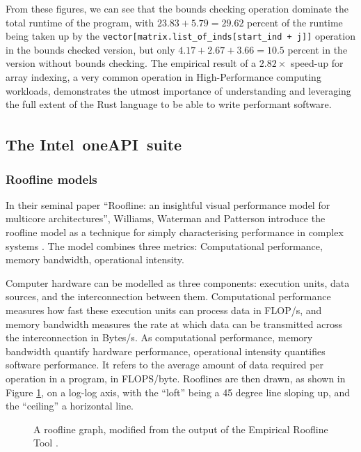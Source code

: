 From these figures, we can see that the bounds checking operation dominate the total runtime of the program, with $23.83 + 5.79 = 29.62$ percent of the runtime being taken up by the \texttt{vector[matrix.list_of_inds[start_ind + j]]} operation in the bounds checked version, but only $4.17 + 2.67 + 3.66 = 10.5$ percent in the version without bounds checking. The empirical result of a $2.82\times$ speed-up for array indexing, a very common operation in High-Performance computing workloads, demonstrates the utmost importance of understanding and leveraging the full extent of the Rust language to be able to write performant software.

\subsection{The Intel\textsuperscript{\textregistered}\ oneAPI\texttrademark\ suite}
\label{ssec:intel-advisor-profiler}

\subsubsection{Roofline models}
\label{sssec:roofline-models}

In their seminal paper ``Roofline: an insightful visual performance model for multicore architectures'', Williams, Waterman and Patterson introduce the roofline model as a technique for simply characterising performance in complex systems \cite{williamsRooflineInsightfulVisual2009}. The model combines three metrics: Computational performance, memory bandwidth, operational intensity.

Computer hardware can be modelled as three components: execution units, data sources, and the interconnection between them. Computational performance measures how fast these execution units can process data in FLOP/s, and memory bandwidth measures the rate at which data can be transmitted across the interconnection in Bytes/s. As computational performance, memory bandwidth quantify hardware performance, operational intensity quantifies software performance. It refers to the average amount of data required per operation in a program, in FLOPS/byte. Rooflines are then drawn, as shown in Figure \ref{fig:ert-roofline}, on a log-log axis, with the ``loft'' being a 45 degree line sloping up, and the ``ceiling'' a horizontal line.

\begin{figure}[H]
    \centering
    
    \caption{A roofline graph, modified from the output of the Empirical Roofline Tool \cite{EmpiricalRooflineTool}.}
    \label{fig:ert-roofline}
\end{figure}

